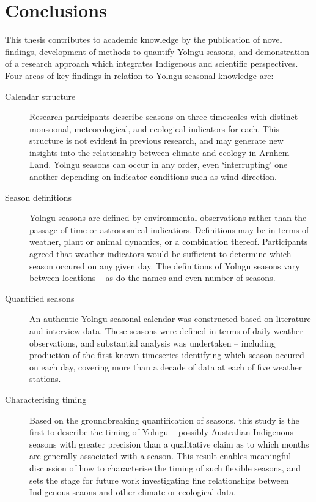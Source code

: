 \chapter{Conclusions}
\label{ch:conclusion}

This thesis contributes to academic knowledge by the publication of novel
findings, development of methods to quantify Yolngu seasons, and demonstration
of a research approach which integrates Indigenous and scientific perspectives.
%
Four areas of key findings in relation to Yolngu seasonal knowledge are:

\begin{description}
\item[Calendar structure]
    Research participants describe seasons on three timescales with distinct
    monsoonal, meteorological, and ecological indicators for each.  This
    structure is not evident in previous research, and may generate new
    insights into the relationship between climate and ecology in Arnhem Land.
    Yolngu seasons can occur in any order, even `interrupting' one another
    depending on indicator conditions such as wind direction.

\item[Season definitions]
    Yolngu seasons are defined by environmental observations rather than the
    passage of time or astronomical indicatiors.  Definitions may be in terms
    of weather, plant or animal dynamics, or a combination thereof.
    Participants agreed that weather indicators would be sufficient to
    determine which season occured on any given day.  The definitions of
    Yolngu seasons vary between locations -- as do the names and even number
    of seasons.

\item[Quantified seasons]
    An authentic Yolngu seasonal calendar was constructed based on literature
    and interview data.  These seasons were defined in terms of daily weather
    observations, and substantial analysis was undertaken -- including
    production of the first known timeseries identifying which season occured
    on each day, covering more than a decade of data at each of five weather
    stations.

\item[Characterising timing]
    Based on the groundbreaking quantification of seasons, this study is the
    first to describe the timing of Yolngu -- possibly Australian Indigenous --
    seasons with greater precision than a qualitative claim as to which months
    are generally associated with a season.  This result enables meaningful
    discussion of how to characterise the timing of such flexible seasons,
    and sets the stage for future work investigating fine relationships between
    Indigenous seaons and other climate or ecological data.
\end{description}

